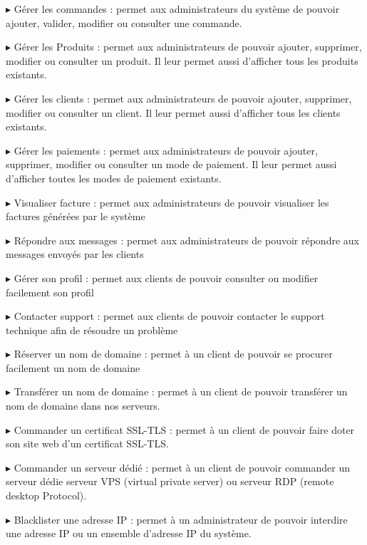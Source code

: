 \documentclass[a4paper, 12pt]{report}
\begin{document}
\noindent $\blacktriangleright$ Gérer les commandes : permet aux administrateurs du système de pouvoir ajouter, valider, modifier ou consulter une commande. 

\noindent $\blacktriangleright$ Gérer les Produits : permet aux administrateurs de pouvoir ajouter, supprimer, modifier ou consulter un produit. Il leur permet aussi d’afficher tous les produits existants. 

\noindent $\blacktriangleright$ Gérer les clients : permet aux administrateurs de pouvoir ajouter, supprimer, modifier ou consulter un client. Il leur permet aussi d’afficher tous les clients existants.

\noindent $\blacktriangleright$ Gérer les paiements : permet aux administrateurs de pouvoir ajouter, supprimer, modifier ou consulter un mode de paiement. Il leur permet aussi d’afficher toutes les modes de paiement existants.

\noindent $\blacktriangleright$ Visualiser facture : permet aux administrateurs de pouvoir visualiser les factures générées par le système 

\noindent $\blacktriangleright$ Répondre aux messages : permet aux administrateurs de pouvoir répondre aux messages envoyés par les clients

\noindent $\blacktriangleright$ Gérer son profil : permet aux clients de pouvoir consulter ou modifier facilement son profil

\noindent $\blacktriangleright$ Contacter support : permet aux clients de pouvoir contacter le support technique afin de résoudre un problème 

\noindent $\blacktriangleright$ Réserver un nom de domaine : permet à un client de pouvoir se procurer facilement un nom de domaine 

\noindent $\blacktriangleright$ Transférer un nom de domaine : permet à un client de pouvoir transférer un nom de domaine dans nos serveurs.


\noindent $\blacktriangleright$ Commander un certificat SSL-TLS : permet à un client de pouvoir faire doter son site web d’un certificat SSL-TLS.

\noindent $\blacktriangleright$ Commander un serveur dédié : permet à un client de pouvoir commander un serveur dédie serveur VPS (virtual private server) ou serveur RDP (remote desktop Protocol).

\noindent $\blacktriangleright$ Blacklister une adresse IP : permet à un administrateur de pouvoir interdire une adresse IP ou un ensemble d’adresse IP du système.
\end{document}
